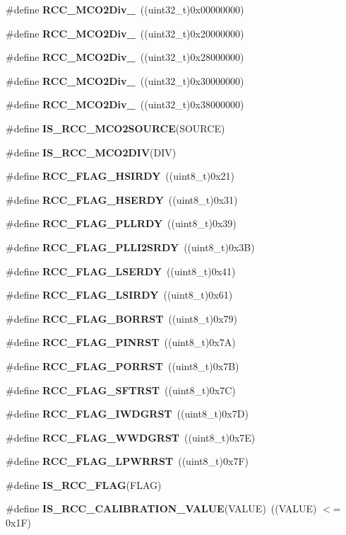 \begin{DoxyCompactItemize}
\item 
\#define \textbf{ R\+C\+C\+\_\+\+M\+C\+O2\+Div\+\_}~((uint32\+\_\+t)0x00000000)
\item 
\#define \textbf{ R\+C\+C\+\_\+\+M\+C\+O2\+Div\+\_}~((uint32\+\_\+t)0x20000000)
\item 
\#define \textbf{ R\+C\+C\+\_\+\+M\+C\+O2\+Div\+\_}~((uint32\+\_\+t)0x28000000)
\item 
\#define \textbf{ R\+C\+C\+\_\+\+M\+C\+O2\+Div\+\_}~((uint32\+\_\+t)0x30000000)
\item 
\#define \textbf{ R\+C\+C\+\_\+\+M\+C\+O2\+Div\+\_}~((uint32\+\_\+t)0x38000000)
\item 
\#define \textbf{ I\+S\+\_\+\+R\+C\+C\+\_\+\+M\+C\+O2\+S\+O\+U\+R\+CE}(S\+O\+U\+R\+CE)
\item 
\#define \textbf{ I\+S\+\_\+\+R\+C\+C\+\_\+\+M\+C\+O2\+D\+IV}(D\+IV)
\item 
\#define \textbf{ R\+C\+C\+\_\+\+F\+L\+A\+G\+\_\+\+H\+S\+I\+R\+DY}~((uint8\+\_\+t)0x21)
\item 
\#define \textbf{ R\+C\+C\+\_\+\+F\+L\+A\+G\+\_\+\+H\+S\+E\+R\+DY}~((uint8\+\_\+t)0x31)
\item 
\#define \textbf{ R\+C\+C\+\_\+\+F\+L\+A\+G\+\_\+\+P\+L\+L\+R\+DY}~((uint8\+\_\+t)0x39)
\item 
\#define \textbf{ R\+C\+C\+\_\+\+F\+L\+A\+G\+\_\+\+P\+L\+L\+I2\+S\+R\+DY}~((uint8\+\_\+t)0x3\+B)
\item 
\#define \textbf{ R\+C\+C\+\_\+\+F\+L\+A\+G\+\_\+\+L\+S\+E\+R\+DY}~((uint8\+\_\+t)0x41)
\item 
\#define \textbf{ R\+C\+C\+\_\+\+F\+L\+A\+G\+\_\+\+L\+S\+I\+R\+DY}~((uint8\+\_\+t)0x61)
\item 
\#define \textbf{ R\+C\+C\+\_\+\+F\+L\+A\+G\+\_\+\+B\+O\+R\+R\+ST}~((uint8\+\_\+t)0x79)
\item 
\#define \textbf{ R\+C\+C\+\_\+\+F\+L\+A\+G\+\_\+\+P\+I\+N\+R\+ST}~((uint8\+\_\+t)0x7\+A)
\item 
\#define \textbf{ R\+C\+C\+\_\+\+F\+L\+A\+G\+\_\+\+P\+O\+R\+R\+ST}~((uint8\+\_\+t)0x7\+B)
\item 
\#define \textbf{ R\+C\+C\+\_\+\+F\+L\+A\+G\+\_\+\+S\+F\+T\+R\+ST}~((uint8\+\_\+t)0x7\+C)
\item 
\#define \textbf{ R\+C\+C\+\_\+\+F\+L\+A\+G\+\_\+\+I\+W\+D\+G\+R\+ST}~((uint8\+\_\+t)0x7\+D)
\item 
\#define \textbf{ R\+C\+C\+\_\+\+F\+L\+A\+G\+\_\+\+W\+W\+D\+G\+R\+ST}~((uint8\+\_\+t)0x7\+E)
\item 
\#define \textbf{ R\+C\+C\+\_\+\+F\+L\+A\+G\+\_\+\+L\+P\+W\+R\+R\+ST}~((uint8\+\_\+t)0x7\+F)
\item 
\#define \textbf{ I\+S\+\_\+\+R\+C\+C\+\_\+\+F\+L\+AG}(F\+L\+AG)
\item 
\#define \textbf{ I\+S\+\_\+\+R\+C\+C\+\_\+\+C\+A\+L\+I\+B\+R\+A\+T\+I\+O\+N\+\_\+\+V\+A\+L\+UE}(V\+A\+L\+UE)~((V\+A\+L\+UE) $<$= 0x1\+F)
\end{DoxyCompactItemize}
